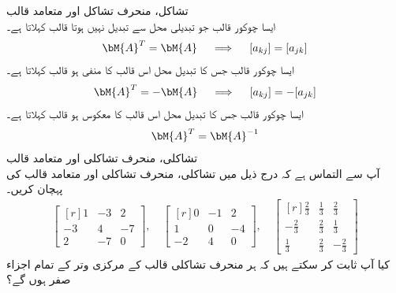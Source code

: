\quad تشاکل، منحرف تشاکل اور  متعامد  قالب\\
ایسا  چوکور قالب  جو تبدیلی محل سے  تبدیل نہیں ہوتا  قالب کہلاتا ہے۔
\begin{align}\label{مساوات_امتیازی_تشاکل_منحرف_تشاکل_قائمہ_الف}
\bM{A}^T=\bM{A} \quad \implies \quad [a_{kj}]=[a_{jk}]
\end{align}
ایسا  چوکور قالب  جس کا تبدیل محل اس قالب کا منفی  ہو  قالب کہلاتا ہے۔
\begin{align}\label{مساوات_امتیازی_تشاکل_منحرف_تشاکل_قائمہ_ب}
\bM{A}^T=-\bM{A}\quad \implies \quad [a_{kj}]=-[a_{jk}]
\end{align}
ایسا  چوکور قالب  جس کا تبدیل محل اس  قالب کا معکوس ہو   قالب کہلاتا ہے۔
\begin{align}\label{مساوات_امتیازی_تشاکل_منحرف_تشاکل_قائمہ_پ}
\bM{A}^T=\bM{A}^{-1}
\end{align}
\quad تشاکلی، منحرف تشاکلی اور متعامد قالب\\
آپ سے التماس ہے کہ درج ذیل میں تشاکلی، منحرف تشاکلی اور  متعامد  قالب کی پہچان کریں۔
\begin{align*}
\begin{bmatrix*}[r] 1&-3&2\\-3&4&-7\\2&-7&0 \end{bmatrix*},\quad \begin{bmatrix*}[r] 0&-1&2\\1&0&-4\\-2&4&0 \end{bmatrix*},\quad
\begin{bmatrix*}[r] \tfrac{2}{3}&\tfrac{1}{3}&\tfrac{2}{3}\\-\tfrac{2}{3}&\tfrac{2}{3}&\tfrac{1}{3}\\ \tfrac{1}{3}&\tfrac{2}{3}&-\tfrac{2}{3} \end{bmatrix*}
\end{align*}
کیا آپ ثابت کر سکتے ہیں کہ ہر منحرف تشاکلی قالب کے مرکزی وتر کے تمام اجزاء صفر ہوں گے؟

